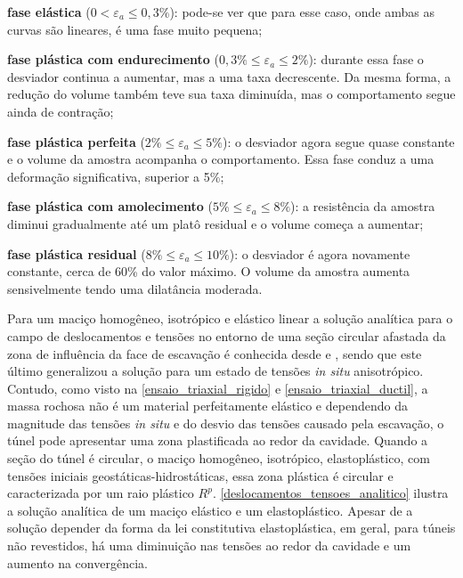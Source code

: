 \begin{alineas}
	
	\item \textbf{fase elástica} ($0 < \varepsilon_a \le 0,3\%$): pode-se ver que para esse caso, onde ambas as curvas são lineares, é uma fase muito pequena;
	
	\item \textbf{fase plástica com endurecimento} ($0,3\%\le \varepsilon_a \le 2\%$): durante essa fase o desviador continua a aumentar, mas a uma taxa decrescente. Da mesma forma, a redução do volume também teve sua taxa diminuída, mas o comportamento segue ainda de contração;
	
	\item \textbf{fase plástica perfeita} ($2\%\le \varepsilon_a \le 5\%$): o desviador agora segue quase constante e o volume da amostra acompanha o comportamento. Essa fase conduz a uma deformação significativa, superior a 5\%;
	
	\item \textbf{fase plástica com amolecimento} ($5\%\le \varepsilon_a \le 8\%$): a resistência da amostra diminui gradualmente até um platô residual e o volume começa a aumentar;
	
	\item \textbf{fase plástica residual} ($8\%\le \varepsilon_a \le 10\%$): o desviador é agora novamente constante, cerca de 60\% do valor máximo. O volume da amostra aumenta sensivelmente tendo uma dilatância moderada.
	
\end{alineas}

Para um maciço homogêneo, isotrópico e elástico linear a solução analítica para o campo de deslocamentos e tensões no entorno de uma seção circular afastada da zona de influência da face de escavação é conhecida desde  e , sendo que este último generalizou a solução para um estado de tensões \textit{in situ} anisotrópico.  Contudo, como visto na \autoref{ensaio_triaxial_rigido} e \autoref{ensaio_triaxial_ductil}, a massa rochosa não é um material perfeitamente elástico e dependendo da magnitude das tensões \textit{in situ} e do desvio das tensões causado pela escavação, o túnel pode apresentar uma zona plastificada ao redor da cavidade. Quando a seção do túnel é circular, o maciço homogêneo, isotrópico, elastoplástico, com tensões iniciais geostáticas-hidrostáticas, essa zona plástica é circular e caracterizada por um raio plástico $R^p$. \autoref{deslocamentos_tensoes_analitico} ilustra a solução analítica de um maciço elástico e um elastoplástico. Apesar de a solução depender da forma da lei constitutiva elastoplástica, em geral, para túneis não revestidos, há uma diminuição nas tensões ao redor da cavidade e um aumento na convergência.


